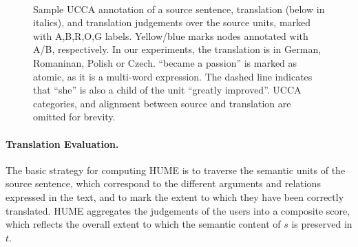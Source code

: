 \documentclass[11pt]{article}
\newcommand{\com}[1]{}
\begin{document}
\begin{figure}
\begin{adjustbox}{trim=2.3cm 0 0 0}
  \\
  \end{adjustbox}

  \caption{\label{fig:hume_tree}
    Sample UCCA annotation of a source sentence, translation (below in italics), 
    and translation judgements over the source units, marked with A,B,R,O,G labels. Yellow/blue marks
    nodes annotated with A/B, respectively.
    In our experiments, the translation is in German, Romaninan, Polish or Czech.
    ``became a passion'' is marked as atomic, as it is a multi-word expression.
    The dashed line indicates that ``she'' is also a child of the unit ``greatly improved''.
    UCCA categories, and alignment between source and translation are omitted for brevity.}
  
\end{figure}


\paragraph{Translation Evaluation.}
The basic strategy for computing HUME is to traverse the semantic units
of the source sentence, which correspond to the different arguments and relations expressed
in the text, and to mark the extent to which they have been correctly translated.
HUME aggregates the judgements of the users into a composite score, 
which reflects the overall extent to which the semantic content of $s$ is preserved in $t$.
\end{document}
